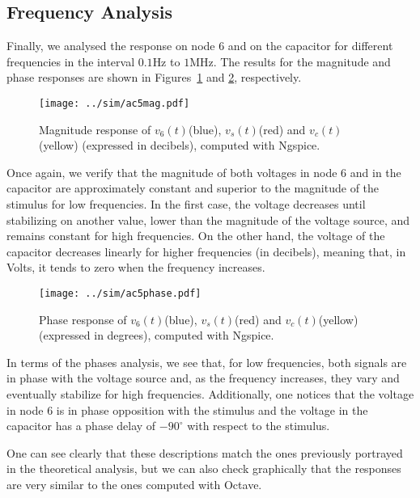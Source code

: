 \subsection{Frequency Analysis} \label{subsec:freqanalysis}

Finally, we analysed the response on node 6 and on the capacitor for different frequencies in the interval $0.1$Hz to $1$MHz. The results for the magnitude and phase responses are shown in Figures~\ref{fig:simmag} and \ref{fig:simphase}, respectively.

\begin{figure}[H] \centering
\texttt{[image: ../sim/ac5mag.pdf]}
\caption{Magnitude response of $v_6(t)$(blue), $v_s(t)$(red) and $v_c(t)$(yellow) (expressed in decibels), computed with Ngspice.}
\label{fig:simmag}
\end{figure}

Once again, we verify that the magnitude of both voltages in node 6 and in the capacitor are approximately constant and superior to the magnitude of the stimulus for low frequencies. In the first case, the voltage decreases until stabilizing on another value, lower than the magnitude of the voltage source, and remains constant for high frequencies. On the other hand, the voltage of the capacitor decreases linearly for higher frequencies (in decibels), meaning that, in Volts, it tends to zero when the frequency increases.

\begin{figure}[H] \centering
\texttt{[image: ../sim/ac5phase.pdf]}
\caption{Phase response of $v_6(t)$(blue), $v_s(t)$(red) and $v_c(t)$(yellow) (expressed in degrees), computed with Ngspice.}
\label{fig:simphase}
\end{figure}

In terms of the phases analysis, we see that, for low frequencies, both signals are in phase with the voltage source and, as the frequency increases, they vary and eventually stabilize for high frequencies. Additionally, one notices that the voltage in node 6 is in phase opposition with the stimulus and the voltage in the capacitor has a phase delay of $-90^{\circ}$ with respect to the stimulus.

One can see clearly that these descriptions match the ones previously portrayed in the theoretical analysis, but we can also check graphically that the responses are very similar to the ones computed with Octave.
